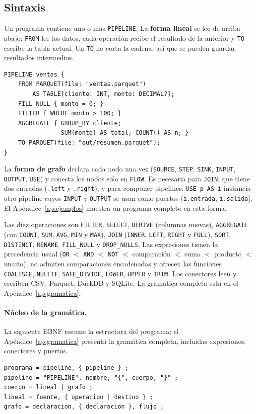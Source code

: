\documentclass[sigplan,screen,nonacm]{acmart}
\begin{document}
\subsection{Sintaxis}
Un programa contiene uno o más \texttt{PIPELINE}. La \textbf{forma lineal} se lee de arriba
abajo: \texttt{FROM} lee los datos, cada operación recibe el resultado de la anterior y
\texttt{TO} escribe la tabla actual. Un \texttt{TO} no corta la cadena, así que se pueden
guardar resultados intermedios.

\begin{lstlisting}[language=etl]
PIPELINE ventas {
    FROM PARQUET(file: "ventas.parquet")
        AS TABLE[cliente: INT, monto: DECIMAL?];
    FILL_NULL { monto = 0; }
    FILTER { WHERE monto > 100; }
    AGGREGATE { GROUP_BY cliente;
                SUM(monto) AS total; COUNT() AS n; }
    TO PARQUET(file: "out/resumen.parquet");
}
\end{lstlisting}

La \textbf{forma de grafo} declara cada nodo una vez (\texttt{SOURCE}, \texttt{STEP},
\texttt{SINK}, \texttt{INPUT}, \texttt{OUTPUT}, \texttt{USE}) y conecta los nodos solo en
\texttt{FLOW}. Es necesaria para \texttt{JOIN}, que tiene dos entradas (\texttt{.left} y
\texttt{.right}), y para componer pipelines: \texttt{USE p AS i} instancia otro pipeline cuyos
\texttt{INPUT} y \texttt{OUTPUT} se usan como puertos (\texttt{i.entrada}, \texttt{i.salida}).
El Apéndice~\ref{ap:ejemplos} muestra un programa completo en esta forma.

Las diez operaciones son \texttt{FILTER}, \texttt{SELECT}, \texttt{DERIVE} (columnas
nuevas), \texttt{AGGREGATE} (con \texttt{COUNT}, \texttt{SUM}, \texttt{AVG}, \texttt{MIN} y
\texttt{MAX}), \texttt{JOIN} (\texttt{INNER}, \texttt{LEFT}, \texttt{RIGHT} y \texttt{FULL}),
\texttt{SORT}, \texttt{DISTINCT}, \texttt{RENAME}, \texttt{FILL\_NULL} y \texttt{DROP\_NULLS}.
Las expresiones tienen la precedencia usual
(\texttt{OR} $<$ \texttt{AND} $<$ \texttt{NOT} $<$ comparación $<$ suma $<$ producto $<$
unario), no admiten comparaciones encadenadas y ofrecen las funciones \texttt{COALESCE},
\texttt{NULLIF}, \texttt{SAFE\_DIVIDE}, \texttt{LOWER}, \texttt{UPPER} y \texttt{TRIM}. Los
conectores leen y escriben CSV, Parquet, DuckDB y SQLite. La gramática completa está en el
Apéndice~\ref{ap:gramatica}.

\paragraph{Núcleo de la gramática.}
La siguiente EBNF resume la estructura del programa; el Apéndice~\ref{ap:gramatica}
presenta la gramática completa, incluidas expresiones, conectores y puertos.
\begin{lstlisting}[language={}]
programa = pipeline, { pipeline } ;
pipeline = "PIPELINE", nombre, "{", cuerpo, "}" ;
cuerpo = lineal | grafo ;
lineal = fuente, { operacion | destino } ;
grafo = declaracion, { declaracion }, flujo ;
\end{lstlisting}
\end{document}
